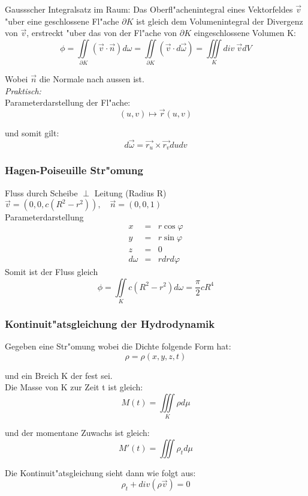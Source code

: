 \documentclass[10pt, a4paper, twocolumn]{scrartcl}
\begin{document}
Gaussscher Integralsatz im Raum: Das Oberfl"achenintegral eines Vektorfeldes $\vec{v}$ "uber eine geschlossene Fl"ache $\partial K$ ist gleich dem Volumenintegral der Divergenz von $\vec{v}$, erstreckt "uber das von der Fl"ache von $\partial K$ eingeschlossene Volumen K:\\

$$\phi=\iint\limits_{\partial K}(\vec{v}\cdotp \vec{n})d\omega=\iint\limits_{\partial K}(\vec{v}\cdotp d\vec{\omega})=\iiint\limits_K div\:\vec{v}dV$$

Wobei $\vec{n}$ die Normale nach aussen ist.\\

\textit{Praktisch:}\\
Parameterdarstellung der Fl"ache:
$$(u,v)\mapsto \vec{r}(u,v)$$

und somit gilt:
$$d\vec{\omega}=\vec{r_u}\times\vec{r_v}dudv$$


\subsubsection{Hagen-Poiseuille Str"omung}

Fluss durch Scheibe $\perp$ Leitung (Radius R)\\
$\vec{v}=(0,0,c(R^2-r^2)),\quad\vec{n}=(0,0,1)$\\
Parameterdarstellung
\begin{eqnarray}
 x& 		=&	r\cos\varphi \nonumber\\
 y& 		=&	r\sin\varphi \nonumber\\
 z& 		=&	0 \nonumber\\
 d\omega& 	=&	rdrd\varphi \nonumber
\end{eqnarray}
Somit ist der Fluss gleich
$$\phi=\iint\limits_K c(R^2-r^2)d\omega=\frac{\pi}{2}cR^4$$

\subsubsection{Kontinuit"atsgleichung der Hydrodynamik}

Gegeben eine Str"omung wobei die Dichte folgende Form hat:
$$\rho=\rho(x,y,z,t)$$

und ein Breich K der fest sei.\\

Die Masse von K zur Zeit t ist gleich:
$$M(t)=\iiint\limits_K\rho d\mu$$

und der momentane Zuwachs ist gleich:
$$M'(t)=\iiint\rho_td\mu$$

Die Kontinuit"atsgleichung sieht dann wie folgt aus:
$$\rho_t + div(\rho\vec{v})=0$$
\end{document}
